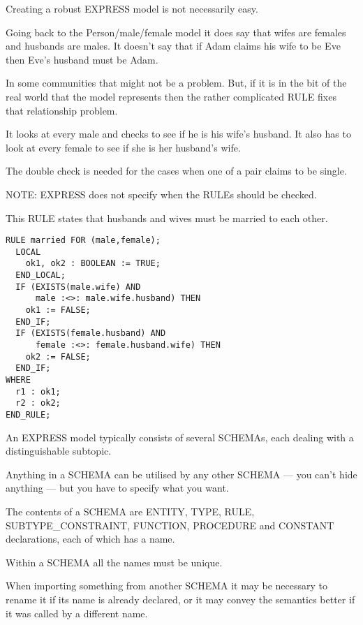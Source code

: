 \begin{remarks}
\remintro


Creating a robust EXPRESS model is not necessarily easy.

Going back to the Person/male/female model it does say that wifes are
females and husbands are males. It doesn't say that if Adam claims his wife 
to be Eve then Eve's husband must be Adam.

In some communities that might not be a problem. But, if it is in the bit 
of the real world that the model represents then the rather complicated RULE 
fixes that relationship problem.

It looks at every male and checks to see if he is his wife's husband.
It also has to look at every female to see if she is her husband's
wife.

    The double check is needed for the cases when one of a pair claims 
to be single. 

    NOTE: EXPRESS does not specify when the RULEs should be checked. 

\remend
\end{remarks}


This RULE states that husbands and wives must be married to each other.
\begin{verbatim}
RULE married FOR (male,female);
  LOCAL
    ok1, ok2 : BOOLEAN := TRUE;
  END_LOCAL;
  IF (EXISTS(male.wife) AND 
      male :<>: male.wife.husband) THEN
    ok1 := FALSE;
  END_IF;
  IF (EXISTS(female.husband) AND
      female :<>: female.husband.wife) THEN
    ok2 := FALSE;
  END_IF;
WHERE
  r1 : ok1;
  r2 : ok2;
END_RULE;
\end{verbatim}


\begin{remarks}
\remintro


An EXPRESS model typically consists of several SCHEMAs, each
dealing with a distinguishable subtopic.

   Anything in a SCHEMA can be utilised by any other SCHEMA
--- you can't hide anything --- but you have to specify what
you want.

    The contents of a SCHEMA are ENTITY, TYPE, RULE, SUBTYPE\_CONSTRAINT,
FUNCTION, PROCEDURE and CONSTANT declarations, each of which has a name.

    Within a SCHEMA all the names must be unique.

    When importing something from another SCHEMA it may be necessary 
to rename it if its name is already declared, or it may convey the 
semantics better if it was called by a different name.

\remend
\end{remarks}

